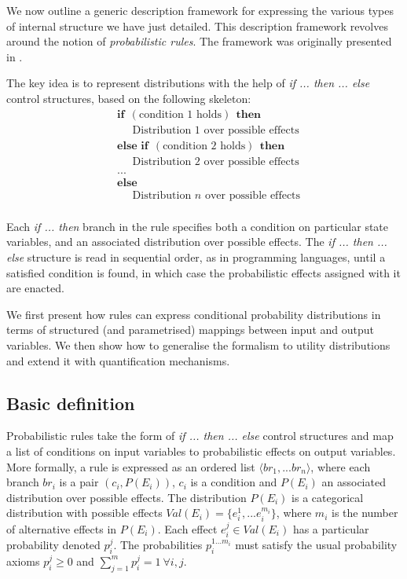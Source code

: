 We now outline a generic description framework for expressing the various types of internal structure we have just detailed.  This description framework revolves around the notion of \textit{probabilistic rules}.  The framework was originally presented in \cite{rulebasedmodels-sigdial2012,lison-semdial2012}.  

The key idea is to represent distributions with the help of \textit{if ... then ... else} control structures, based on the following skeleton:
\begin{equation*}
\begin{aligned}
& \textbf{if} \ \ (\text{condition 1 holds}) \ \ \textbf{then} \\ 
& \;\;\;\;\; \text{Distribution 1 over possible effects} \\
& \textbf{else if} \ \ (\text{condition 2 holds}) \ \ \textbf{then} \\ 
& \;\;\;\;\; \text{Distribution 2 over possible effects} \\
& ... \\
& \textbf{else} \\
& \;\;\;\;\; \text{Distribution } n \text{ over possible effects} \\ 
\end{aligned}
\label{eq:probrule}
\end{equation*}

Each \textit{if ... then} branch in the rule specifies both a condition on particular state variables, and an associated distribution over possible effects.   The \textit{if ... then ... else} structure is read in sequential order, as in programming languages, until a satisfied condition is found, in which case the probabilistic effects assigned with it are enacted.

We first present how rules can express conditional probability distributions in terms of structured (and parametrised) mappings between input and output variables.  We then show how to  generalise the formalism to utility distributions and extend it with quantification mechanisms.

\subsection{Basic definition}

Probabilistic rules take the form of \textit{if ... then ... else} control structures and map a list of conditions on input variables to probabilistic effects on output variables. More formally, a rule is expressed as an ordered list $\langle br_1, ... br_n\rangle$, where each branch $br_i$ is a pair $(c_i, P(E_i))$, $c_i$ is a condition and $P(E_i)$ an associated distribution over possible effects.  The distribution $P(E_i)$ is a categorical distribution with possible effects $Val(E_i) = \{e_i^1,... e_i^{m_i}\}$, where $m_i$ is the number of alternative effects in $P(E_i)$.  Each effect $e_i^j \in Val(E_i)$ has a particular probability denoted $p_i^j$.  The probabilities $p_i^{1...m_i}$ must satisfy the usual probability axioms $p_i^j \geq 0$ and $\sum_{j = 1}^m p_i^j = 1 \ \forall i,j$. 

